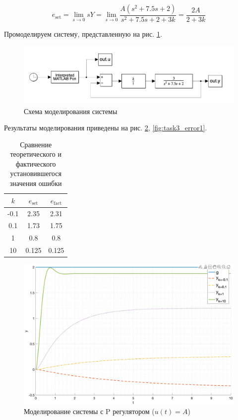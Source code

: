 \begin{equation}
    e_{\text{set}} = \lim_{s \to 0} sY = \lim_{s \to 0} \frac{A(s^2 + 7.5s + 2)}{s^2 + 7.5s + 2 + 3k} = \frac{2A}{2 + 3k}
\end{equation}

Промоделируем систему, представленную на рис. \ref{fig:task3_scheme}.
\begin{figure}[ht!]
    \centering
    \includegraphics[width=\textwidth]{"media/scheme3.png"}
    \caption{Схема моделирования системы}
    \label{fig:task3_scheme}
\end{figure}

Результаты моделирования приведены на рис. \ref{fig:task3_out1}, \ref{fig:task3_error1}.

\begin{table}
    \centering
    \begin{tabular}{|c|c|c|}
        \hline
        $k$ & $e_{\text{set}}$ & $e_{\text{fact}}$ \\
        \hline
        -0.1 & 2.35 & 2.31 \\
        0.1 & 1.73 & 1.75 \\
        1 & 0.8 & 0.8 \\
        10 & 0.125 & 0.125 \\
        \hline
    \end{tabular}
    \caption{Сравнение теоретического и фактического установившегося значения ошибки}
\end{table}

\begin{figure}
    \centering
    \includegraphics[width=\textwidth]{"media/plots/task3_out1.png"}
    \caption{Моделирование системы с P регулятором ($u(t) = A$)}
    \label{fig:task3_out1}
\end{figure}

